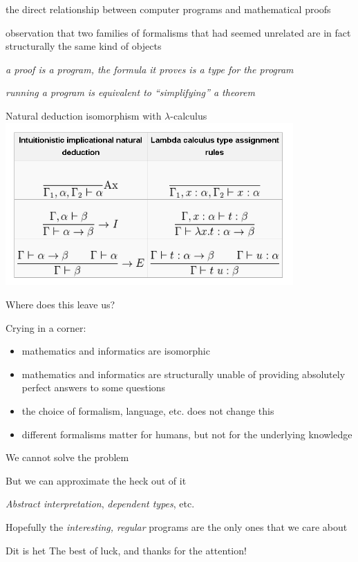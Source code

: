 \documentclass{beamer}
\begin{document}
\begin{slide}{
\item the direct relationship between computer programs and mathematical proofs
\item observation that two families of formalisms that had seemed unrelated are in fact structurally the same kind of objects
\item \textit{a proof is a program, the formula it proves is a type for the program}
\item \textit{running a program is equivalent to ``simplifying'' a theorem}
}\end{slide}

\begin{frame}{Natural deduction isomorphism with $\lambda$-calculus}
\includegraphics[width=11cm]{curryhoward.png}
\end{frame}


\begin{slide}{
\item Where does this leave us?
\pause
\item Crying in a corner:
\begin{itemize}
\item mathematics and informatics are isomorphic
\item mathematics and informatics are structurally unable of providing absolutely perfect answers to some questions
\item the choice of formalism, language, etc. does not change this
\item different formalisms matter for humans, but not for the underlying knowledge
\end{itemize}
}\end{slide}

\begin{slide}{
\item We cannot solve the problem
\item But we can approximate the heck out of it
\item \textit{Abstract interpretation}, \textit{dependent types}, etc.
\item Hopefully the \textit{interesting, regular} programs are the only ones that we care about
}\end{slide}

\begin{frame}{Dit is het}
\center
\fontsize{18pt}{7.2}\selectfont
The best of luck, and thanks for the attention!
\end{frame}
\end{document}
